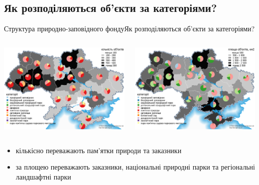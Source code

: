 \documentclass[12pt, aspectratio=1610]{beamer}
\begin{document}
\subsection{Як розподіляються об'єкти за категоріями?}
\begin{frame}{Структура природно-заповідного фонду}{Як розподіляються об'єкти за категоріями?}
	\begin{columns}[c]
		
		
		\includegraphics[width=\textwidth]{./figures/categories_count.png}%
		
		
		\includegraphics[width=\textwidth]{./figures/categories_area.png}
		
	\end{columns}
\begin{itemize}
	\item кількісно переважають пам'ятки природи та заказники
	\item за площею переважають заказники, національні природні парки та регіональні ландшафтні парки
\end{itemize}
\end{frame}
\end{document}
